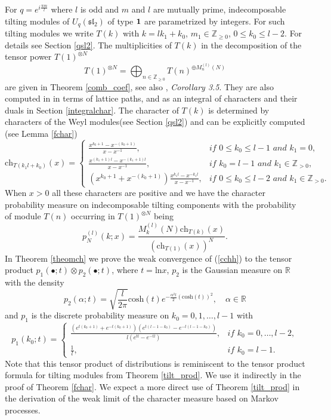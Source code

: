 \documentclass[11pt]{amsart}
\begin{document}
For $q=e^{i\frac{\pi m}{l}}$ where $l$ is odd and $m$ and $l$ are mutually prime, indecomposable tilting modules of $U_q(\mathfrak{sl}_2)$ of type ${\bf 1}$ are parametrized by integers. For such tilting modules we write $T(k)$ with $k=lk_1+k_0$, $m_1\in\mathbb{Z}_{\geq 0}$, $0\leq k_0\leq l-2$. For details see Section \ref{qsl2}. The multiplicities of $T(k)$ in the decomposition of the tensor power $T(1)^{\otimes N}$
$$
T(1)^{\otimes N}= \bigoplus_{n\in\mathbb{Z}_{\geq 0}}T(n)^{\oplus M^{(l)}_n(N)}
$$
are given in Theorem \ref{comb_coef}, see also \cite{And17}, {\it Corollary 3.5}. They are also computed in \cite{Sol} in terms of lattice paths, and as an integral of characters and their duals in Section \ref{integralchar}. The character of $T(k)$ is determined by characters of the Weyl modules(see Section \ref{qsl2}) and can be explicitly computed (see Lemma \ref{fchar})
\begin{equation*}
	\mathrm{ch}_{T(k_1l+k_0)}(x)=
	\begin{cases}
		\frac{x^{k_0+1}-x^{-(k_0+1)}}{x-x^{-1}},& \textit{if $0\leq k_0\leq l-1$ and $k_1=0$},\\
		\frac{x^{(k_1+1)l}-x^{-(k_1+1)l}}{x-x^{-1}},& \textit{if $k_0=l-1$ and $k_1\in\mathbb{Z}_{>0}$},\\
		(x^{k_0+1}+x^{-(k_0+1)})\frac{x^{k_1l}-x^{-k_1l}}{x-x^{-1}},& \textit{if $0\leq k_0\leq l-2$ and $k_1\in\mathbb{Z}_{>0}$}.
	\end{cases}
\end{equation*}
When $x>0$ all these characters are positive and we have the character probability measure on indecomposable tilting components with the probability of module $T(n)$ occurring in $T(1)^{\otimes N}$ being
\begin{equation}\label{cchh}
	p^{(l)}_N(k;x)=\frac{M^{(l)}_{k}(N)\mathrm{ch}_{T(k)}(x)}{(\mathrm{ch}_{T(1)}(x))^N}.
\end{equation}
In Theorem \ref{theomch} we prove the weak convergence of (\ref{cchh}) to the tensor product $p_1(\bullet;t)\otimes p_2(\bullet;t)$, where $t=\mathrm{ln}x$, $p_2$ is the Gaussian measure on $\mathbb{R}$ with the density
\begin{equation*}
	p_2(\alpha;t)=\sqrt{\frac{l}{2\pi}}\mathrm{cosh}(t)e^{-\frac{\alpha^2l}{2}\left(\mathrm{cosh}(t)\right)^2},\quad\alpha\in\mathbb{R}
\end{equation*}
and $p_1$ is the discrete probability measure on $k_0=0,1,\ldots,l-1$ with
\begin{equation*}
p_1(k_0;t)=
\begin{cases}
	\frac{(e^{t(k_0+1)}+e^{-t(k_0+1)})(e^{t(l-1-k_0)}-e^{-t(l-1-k_0)})}{l(e^{tl}-e^{-tl})},& \textit{if $k_0=0,\ldots,l-2$},\\
	\frac{1}{l},& \textit{if $k_0=l-1$}.
\end{cases}
\end{equation*}
Note that this tensor product of distributions is reminiscent to the tensor product formula for tilting modules from Theorem \ref{tilt_prod}. We use it indirectly in the proof of Theorem \ref{fchar}. We expect a more direct use of Theorem \ref{tilt_prod} in the derivation of the weak limit of the character measure based on Markov processes.
\end{document}
